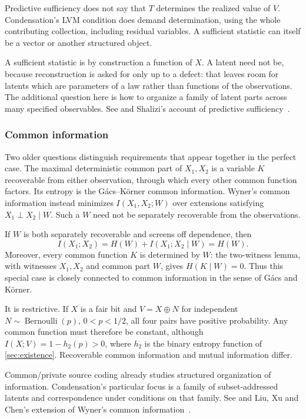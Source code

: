 \documentclass[11pt]{article}
\begin{document}
Predictive sufficiency does not say that $T$ determines the realized value of
$V$. Condensation's LVM condition does demand determination, using the whole
contributing collection, including residual variables. A sufficient
statistic can itself be a vector or another structured object.

A sufficient statistic is by construction a function of $X$. A latent need not
be, because reconstruction is asked for only up to a defect: that leaves room
for latents which are parameters of a law rather than functions of the
observations. The additional
question here is how to organize a family of latent parts across many specified
observables. See \citet{fisher1922mathematical}
and Shalizi's account of predictive sufficiency~\citep{shalizi2019prediction}.

\subsubsection{Common information}
Two older questions distinguish requirements that appear together in the
perfect case. The maximal deterministic common part of $X_1,X_2$ is a variable
$K$ recoverable from either observation, through which every other common
function factors. Its entropy is the G\'acs--K\"orner common information.
Wyner's common information instead minimizes $I(X_1,X_2;W)$ over extensions
satisfying $X_1\perp X_2\mid W$. Such a $W$ need not be separately recoverable
from the observations.

If $W$ is both separately recoverable and screens off dependence, then
\[
 I(X_1;X_2)=H(W)+I(X_1;X_2\mid W)=H(W).
\]
Moreover, every common function $K$ is determined by $W$: the two-witness lemma,
with witnesses $X_1,X_2$ and common part $W$, gives $H(K\mid W)=0$.
Thus this special case is closely connected to common information in the sense
of G\'acs and K\"orner.

It is restrictive. If $X$ is a fair bit and $V=X\mathbin{\oplus}N$ for independent
$N\sim\operatorname{Bernoulli}(p)$, $0<p<1/2$, all four pairs have positive
probability. Any common function must therefore be constant, although
$I(X;V)=1-h_2(p)>0$, where
$h_2$ is the binary entropy function of \cref{sec:existence}. Recoverable common information and
mutual information differ.

Common/private source coding already studies structured organization
of information. Condensation's particular focus is a family of subset-addressed
latents and correspondence under conditions on that family.
See \citet{gacs1973common}
and Liu, Xu and Chen's extension of Wyner's common information~\citep{liu2010common}.
\end{document}

